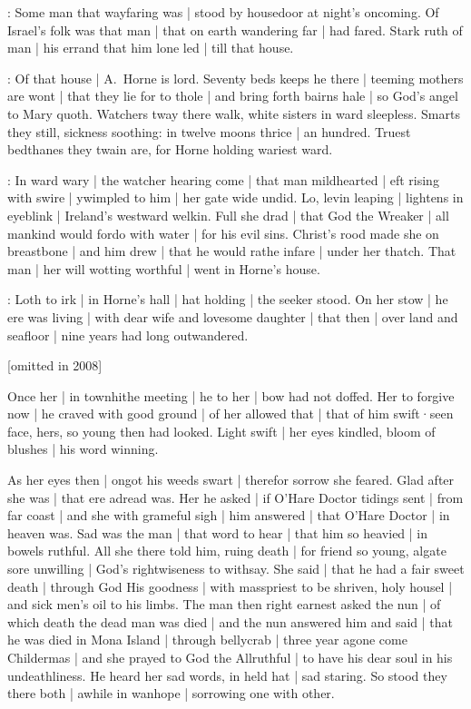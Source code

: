 

:
Some man that wayfaring was |
stood by housedoor at night's oncoming.
Of Israel's folk was that man |
that on earth wandering far |
had fared.
Stark ruth of man |
his errand that him lone led |
till that house.


:
Of that house |
A.~Horne is lord.
Seventy beds keeps he there |
teeming mothers are wont |
that they lie for to thole |
and bring forth bairns hale |
so God's angel to Mary quoth.
Watchers tway there walk,
white sisters in ward sleepless.
Smarts they still,
sickness soothing:
in twelve moons thrice |
an hundred.
Truest bedthanes they twain are,
for Horne holding wariest ward.


:
In ward wary |
the watcher hearing come |
that man mildhearted |
eft rising with swire |
ywimpled to him |
her gate wide undid.
Lo,
levin leaping |
lightens in eyeblink |
Ireland's westward welkin.
Full she drad |
that God the Wreaker |
all mankind would fordo with water |
for his evil sins.
Christ's rood made she on breastbone |
and him drew |
that he would rathe infare |
under her thatch.
That man |
her will wotting worthful |
went in Horne's house.



:
Loth to irk |
in Horne's hall |
hat holding |
the seeker stood.
On her stow |
he ere was living |
with dear wife and lovesome daughter |
that then |
over land and seafloor |
nine years had long outwandered.

[omitted in 2008]

Once her |
in townhithe meeting |
he to her |
bow had not doffed.
Her to forgive now |
he craved with good ground |
of her allowed that |
that of him swift·seen face,
hers,
so young then had looked.
Light swift |
her eyes kindled,
bloom of blushes |
his word winning.


As her eyes then |
ongot his weeds swart |
therefor sorrow she feared.
Glad after she was |
that ere adread was.
Her he asked |
if O'Hare Doctor tidings sent |
from far coast |
and she with grameful sigh |
him answered |
that O'Hare Doctor |
in heaven was.
Sad was the man |
that word to hear |
that him so heavied |
in bowels ruthful.
All she there told him,
ruing death |
for friend so young,
algate sore unwilling |
God's rightwiseness to withsay.
She said |
that he had a fair sweet death |
through God His goodness |
with masspriest to be shriven,
holy housel |
and sick men's oil to his limbs.
The man then right earnest asked the nun |
of which death the dead man was died |
and the nun answered him and said |
that he was died in Mona Island |
through bellycrab |
three year agone come Childermas |
and she prayed to God the Allruthful |
to have his dear soul in his undeathliness.
He heard her sad words,
in held hat |
sad staring.
So stood they there both |
awhile in wanhope |
sorrowing one with other.

